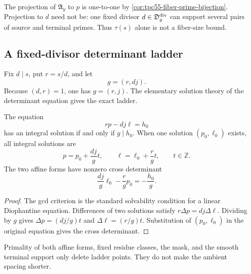 The projection of \(\mathfrak A_y\) to \(p\) is one-to-one by
\cref{cor:tpc55-fiber-prime-bijection}.  Projection to \(d\) need not be:
one fixed divisor \(d\in\mathfrak D_y^{\rm div}\) can support several
pairs of source and terminal primes.  Thus \(\tau(s)\) alone is not a
fiber-size bound.

\subsection{A fixed-divisor determinant ladder}

Fix \(d\mid s\), put \(r=s/d\), and let
\begin{equation}
 g=(r,dj).
 \label{eq:tpc55-ladder-gcd}
\end{equation}
Because \((d,r)=1\), one has \(g=(r,j)\).  The elementary solution theory
of the determinant equation gives the exact ladder.

\begin{lemma}
\label{lem:tpc55-complete-ladder}
The equation
\begin{equation}
 rp-dj\ell=h_0
 \label{eq:tpc55-determinant-ladder-equation}
\end{equation}
has an integral solution if and only if \(g\mid h_0\).  When one solution
\((p_0,\ell_0)\) exists, all integral solutions are
\begin{equation}
 \boxed{
 p=p_0+\frac{dj}{g}t,
 \qquad
 \ell=\ell_0+\frac r g t,
 \qquad t\in\mathbb Z.}
 \label{eq:tpc55-complete-ladder}
\end{equation}
The two affine forms have nonzero cross determinant
\begin{equation}
 \frac{dj}{g}\ell_0-\frac r g p_0=-\frac{h_0}{g}.
 \label{eq:tpc55-ladder-cross-determinant}
\end{equation}
\end{lemma}

\begin{proof}
The gcd criterion is the standard solvability condition for a linear
Diophantine equation.  Differences of two solutions satisfy
\(r\Delta p=dj\Delta\ell\).  Dividing by \(g\) gives
\(\Delta p=(dj/g)t\) and \(\Delta\ell=(r/g)t\).  Substitution of
\((p_0,\ell_0)\) in the original equation gives the cross determinant.
\end{proof}

Primality of both affine forms, fixed residue classes, the mask, and the
smooth terminal support only delete ladder points.  They do not make the
ambient spacing shorter.

